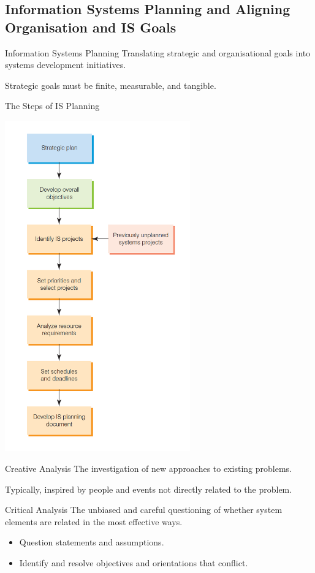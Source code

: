 \documentclass[\main/notes.tex]{subfiles}
\begin{document}
			\subsection[Information Systems Planning]{Information Systems Planning and Aligning Organisation and IS Goals}
				\begin{definition}{Information Systems Planning}
					Translating strategic and organisational goals into systems development initiatives.

					Strategic goals must be finite, measurable, and tangible.
				\end{definition}
				\begin{sidenote}{The Steps of IS Planning}
					\begin{center}
						\includegraphics[width=0.6\textwidth]{chapter11/is_planning_steps.png}
					\end{center}
				\end{sidenote}
				\pagebreak
				\begin{definition}{Creative Analysis}
					The investigation of new approaches to existing problems. 

					Typically, inspired by people and events not directly related to the problem.
				\end{definition}
				\begin{definition}{Critical Analysis}
					The unbiased and careful questioning of whether system elements are related in the most effective ways.
					\begin{itemize}[nosep]
						\item Question statements and assumptions.
						\item Identify and resolve objectives and orientations that conflict.
					\end{itemize}
				\end{definition}
\end{document}
